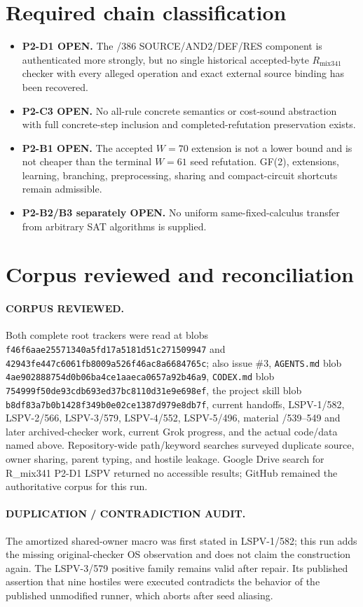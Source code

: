 \documentclass[11pt]{article}
\begin{document}
\section{Required chain classification}
\begin{itemize}
\item \textbf{P2-D1 OPEN.}  The /386 SOURCE/AND2/DEF/RES component is
authenticated more strongly, but no single historical accepted-byte
\(R_{\mathrm{mix341}}\) checker with every alleged operation and exact
external source binding has been recovered.
\item \textbf{P2-C3 OPEN.}  No all-rule concrete semantics or cost-sound
abstraction with full concrete-step inclusion and completed-refutation
preservation exists.
\item \textbf{P2-B1 OPEN.}  The accepted \(W=70\) extension is not a lower
bound and is not cheaper than the terminal \(W=61\) seed refutation.  GF(2),
extensions, learning, branching, preprocessing, sharing and compact-circuit
shortcuts remain admissible.
\item \textbf{P2-B2/B3 separately OPEN.}  No uniform same-fixed-calculus
transfer from arbitrary SAT algorithms is supplied.
\end{itemize}

\section{Corpus reviewed and reconciliation}
\paragraph{CORPUS REVIEWED.}
Both complete root trackers were read at blobs
\texttt{f46f6aae25571340a5fd17a5181d51c271509947} and
\texttt{42943fe447c6061fb8009a526f46ac8a6684765c}; also issue \#3,
\texttt{AGENTS.md} blob
\texttt{4ae902888754d0b06ba4ce1aaeca0657a92b46a9},
\texttt{CODEX.md} blob
\texttt{754999f50de93cdb693ed37bc8110d31e9e698ef},
the project skill blob
\texttt{b8df83a7b0b1428f349b0e02ce1387d979e8db7f}, current handoffs,
LSPV-1/582, LSPV-2/566, LSPV-3/579, LSPV-4/552, LSPV-5/496,
material /539--549 and later archived-checker work, current Grok progress,
and the actual code/data named above.  Repository-wide path/keyword searches
surveyed duplicate source, owner sharing, parent typing, and hostile leakage.
Google Drive search for R\_mix341 P2-D1 LSPV returned no accessible results;
GitHub remained the authoritative corpus for this run.

\paragraph{DUPLICATION / CONTRADICTION AUDIT.}
The amortized shared-owner macro was first stated in LSPV-1/582; this run adds
the missing original-checker OS observation and does not claim the construction
again.  The LSPV-3/579 positive family remains valid after repair.  Its
published assertion that nine hostiles were executed contradicts the behavior
of the published unmodified runner, which aborts after seed aliasing.
\end{document}
